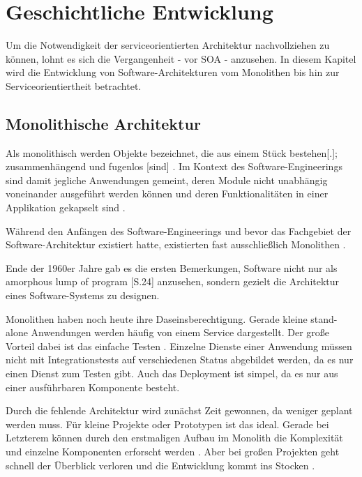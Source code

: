 \section{Geschichtliche Entwicklung}
\label{ch:history}

Um die Notwendigkeit der serviceorientierten Architektur nachvollziehen zu können, lohnt es sich die Vergangenheit - vor SOA - anzusehen. In diesem Kapitel wird die Entwicklung von Software-Architekturen vom Monolithen bis hin zur Serviceorientiertheit betrachtet.

\subsection{Monolithische Architektur}
\label{sec:monolithicArch}

Als monolithisch werden Objekte bezeichnet, die \glqq aus einem Stück bestehen[.]; zusammenhängend und fugenlos [sind]\grqq{} \cite{Duden.monolithisch.25.10.2022}. Im Kontext des Software-Engineerings sind damit jegliche Anwendungen gemeint, deren Module nicht unabhängig voneinander ausgeführt werden können und deren Funktionalitäten in einer Applikation gekapselt sind \cite{Ponce.2019}.

Während den Anfängen des Software-Engineerings und bevor das Fachgebiet der Software-Architektur existiert hatte, existierten fast ausschließlich Monolithen \cite{Kruchten.2006}.  

Ende der 1960er Jahre gab es die ersten Bemerkungen, Software nicht nur als \glqq amorphous lump of program\grqq{} \cite{Kruchten.2006}[S.24] anzusehen, sondern gezielt die Architektur eines Software-Systems zu designen.

Monolithen haben noch heute ihre Daseinsberechtigung. Gerade kleine stand-alone Anwendungen werden häufig von einem Service dargestellt. Der große Vorteil dabei ist das einfache Testen \cite{Ponce.2019}. Einzelne Dienste einer Anwendung müssen nicht mit Integrationstests auf verschiedenen Status abgebildet werden, da es nur einen Dienst zum Testen gibt. Auch das Deployment ist simpel, da es nur aus einer ausführbaren Komponente besteht. 

Durch die \glqq fehlende\grqq{} Architektur wird zunächst Zeit gewonnen, da weniger geplant werden muss. Für kleine Projekte oder Prototypen ist das ideal. Gerade bei Letzterem können durch den erstmaligen Aufbau im Monolith die Komplexität und einzelne Komponenten erforscht werden \cite{Ponce.2019}. Aber bei großen Projekten geht schnell der Überblick verloren und die Entwicklung kommt ins Stocken \cite{Ponce.2019}. 

